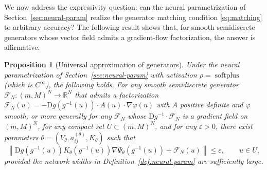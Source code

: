 \documentclass[11pt]{article}
\newtheorem{proposition}{Proposition}
\newcommand{\R}{\mathbb{R}}
\newcommand{\cFN}{\mathcal{F}_N}
\newcommand{\softplus}{\operatorname{softplus}}
\newcommand{\norm}[1]{\left\lVert #1 \right\rVert}
\begin{document}
We now address the expressivity question: can the neural parametrization of Section~\ref{sec:neural-param} realize the generator matching condition \eqref{eq:matching} to arbitrary accuracy? The following result shows that, for smooth semidiscrete generators whose vector field admits a gradient-flow factorization, the answer is affirmative.

\begin{proposition}[Universal approximation of generators]\label{prop:universal-approx}
Under the neural parametrization of Section~\ref{sec:neural-param} with activation $\rho=\softplus$ (which is $C^{\infty}$), the following holds. For any smooth semidiscrete generator $\cFN:(m,M)^N\to \R^N$ that admits a factorization $\cFN(u) = -\mathrm{D}g(g^{-1}(u))\cdot A(u)\cdot \nabla \varphi(u)$ with $A$ positive definite and $\varphi$ smooth, or more generally for any $\cFN$ whose $\mathrm{D}g^{-1}\cdot \cFN$ is a gradient field on $(m,M)^N$, for any compact set $U\subset (m,M)^N$, and for any $\varepsilon>0$, there exist parameters $\theta=(V_{\theta},a_{ij}^{(\theta)},K_{\theta})$ such that
\begin{equation}\label{eq:universal-approx}
\norm{\mathrm{D}g(g^{-1}(u))K_{\theta}(g^{-1}(u))\nabla \Psi_{\theta}(g^{-1}(u))+\cFN(u)}\le \varepsilon, \qquad u\in U,
\end{equation}
provided the network widths in Definition~\ref{def:neural-param} are sufficiently large.
\end{proposition}
\end{document}
